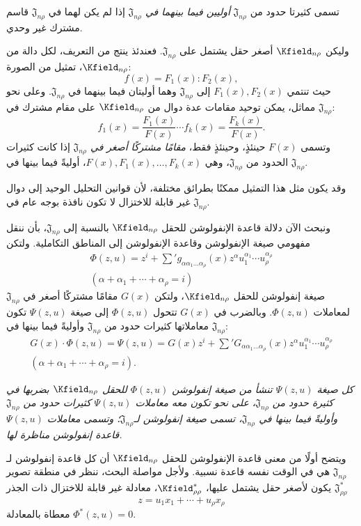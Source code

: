 \documentclass[11pt]{article}
\providecommand{\Jdom}{\mathfrak{J}}
\begin{document}
تسمى كثيرتا حدود من $\Jdom_{n\rho}$ \emph{أوليين فيما بينهما في $\Jdom_{n\rho}$} إذا لم يكن لهما في $\Jdom_{n\rho}$ قاسم مشترك غير وحدي.

وليكن $\Kfield_{n\rho}$ أصغر حقل يشتمل على $\Jdom_{n\rho}$. فعندئذ ينتج من التعريف، لكل دالة من $\Kfield_{n\rho}$، تمثيل من الصورة:
\[
f(x)=F_1(x):F_2(x),
\]
حيث تنتمي $F_1(x),F_2(x)$ إلى $\Jdom_{n\rho}$ وهما أوليتان فيما بينهما في $\Jdom_{n\rho}$. وعلى نحو مماثل، يمكن توحيد مقامات عدة دوال من $\Kfield_{n\rho}$ على مقام مشترك في $\Jdom_{n\rho}$:
\[
f_1(x)=\frac{F_1(x)}{F(x)}\cdots f_k(x)=\frac{F_k(x)}{F(x)}.
\]
وتسمى $F(x)$ حينئذٍ، وحينئذٍ فقط، \emph{مقامًا مشتركًا أصغر في $\Jdom_{n\rho}$} إذا كانت كثيرات الحدود من $\Jdom_{n\rho}$، وهي $F(x),F_1(x),\ldots,F_k(x)$، أوليةً فيما بينها في $\Jdom_{n\rho}$.

وقد يكون مثل هذا التمثيل ممكنًا بطرائق مختلفة، لأن قوانين التحليل الوحيد إلى دوال غير قابلة للاختزال لا تكون نافذة بوجه عام في $\Jdom_{n\rho}$.

ونبحث الآن دلالة قاعدة الإنفولوشن للحقل $\Kfield_{n\rho}$ بالنسبة إلى $\Jdom_{n\rho}$، بأن ننقل مفهومي صيغة الإنفولوشن وقاعدة الإنفولوشن إلى المناطق التكاملية. ولتكن
\[
\begin{gathered}
\Phi(z,u)=z^i+\sum{}' g_{\alpha\alpha_1\ldots\alpha_\rho}(x)z^\alpha u_1^{\alpha_1}\cdots u_\rho^{\alpha_\rho}\\
(\alpha+\alpha_1+\cdots+\alpha_\rho=i)
\end{gathered}
\]
صيغة إنفولوشن للحقل $\Kfield_{n\rho}$، ولتكن $G(x)$ مقامًا مشتركًا أصغر في $\Jdom_{n\rho}$ لمعاملات $\Phi(z,u)$. وبالضرب في $G(x)$ تتحول $\Phi(z,u)$ إلى صيغة $\Psi(z,u)$ تكون معاملاتها كثيرات حدود من $\Jdom_{n\rho}$ وأوليةً فيما بينها في $\Jdom_{n\rho}$:
\[
\begin{gathered}
G(x)\cdot\Phi(z,u)=\Psi(z,u)=G(x)z^i+\sum{}'G_{\alpha\alpha_1\ldots\alpha_\rho}(x)z^\alpha u_1^{\alpha_1}\cdots u_\rho^{\alpha_\rho}\\
(\alpha+\alpha_1+\cdots+\alpha_\rho=i).
\end{gathered}
\]

\emph{كل صيغة $\Psi(z,u)$ تنشأ من صيغة إنفولوشن $\Phi(z,u)$ للحقل $\Kfield_{n\rho}$ بضربها في كثيرة حدود من $\Jdom_{n\rho}$، على نحو تكون معه معاملات $\Psi(z,u)$ كثيرات حدود من $\Jdom_{n\rho}$ وأوليةً فيما بينها في $\Jdom_{n\rho}$، تسمى صيغة إنفولوشن لـ$\Jdom_{n\rho}$؛ وتسمى معاملات $\Psi(z,u)$ قاعدة إنفولوشن مناظرة لها.}

ويتضح أولًا من معنى قاعدة الإنفولوشن للحقل $\Kfield_{n\rho}$ أن كل قاعدة إنفولوشن لـ$\Jdom_{n\rho}$ هي في الوقت نفسه قاعدة نسبية. ولأجل مواصلة البحث، ننظر في منطقة تصوير $\Jdom^*_{\rho\rho}$ يكون لأصغر حقل يشتمل عليها، $\Kfield^*_{\rho\rho}$، معادلة غير قابلة للاختزال ذات الجذر
\[
z=u_1x_1+\cdots+u_\rho x_\rho
\]
معطاة بالمعادلة $\Phi^*(z,u)=0$.
\end{document}

